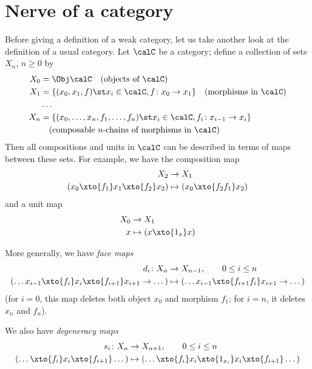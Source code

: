 \section{Nerve of a category}\label{s:nerve}
Before giving a definition of a weak category, let us take another look at the
definition of a usual category. Let $\calC$ be a category; define a collection
of sets $X_n$, $n\ge 0$ by
\begin{equation}\label{e:nerve1}
  \begin{aligned}
    X_0&= \Obj \calC \quad (\text{objects of $\calC$})\\
    X_1&= \{ (x_0, x_1, f)\st x_i \in \calC, f\colon x_0\to x_1\}
                \quad (\text{morphisms in $\calC$})\\
                &\dots\\
    X_n&=\{(x_0, \dots, x_n, f_1, \dots, f_n)\st
           x_i \in \calC, f_i\colon x_{i-1}\to x_i \}\\
            &\quad (\text{composable $n$-chains of morphisms in $\calC$})\\
  \end{aligned}
\end{equation}
Then all compositions and units in $\calC$ can be described in terms
of maps between these sets. For example, we have the composition map
\begin{align*}
  X_2&\to X_1\\
  (x_0\xto{f_1} x_1 \xto{f_2}x_2)&\mapsto (x_0\xto{f_2f_1} x_2)
\end{align*}
and a unit map
\begin{align*}
  X_0&\to X_1\\
  x&\mapsto (x\xto{1_x} x)
\end{align*}

More generally, we have \emph{face maps}
\begin{equation}\label{e:nerve2}
  \begin{aligned}
  d_i\colon X_n&\to X_{n-1}, \qquad 0\le i \le n\\
  (\dots x_{i-1}\xto{f_i} x_i \xto{f_{i+1}} x_{i+1}\to \dots)
  &\mapsto
  (\dots x_{i-1}\xto{f_{i+1}f_i} x_{i+1}\to \dots)
  \end{aligned}
\end{equation}
(for $i=0$, this map deletes both object $x_0$ and morphism $f_1$; for $i=n$,
it deletes $x_n$ and $f_n$).

We also have \emph{degeneracy maps}
\begin{equation}\label{e:nerve3}
  \begin{aligned}
  s_i\colon X_n&\to X_{n+1}, \qquad 0\le i \le n\\
  (\dots \xto{f_i} x_i \xto{f_{i+1}} \dots)
  &\mapsto
  (\dots \xto{f_i} x_i \xto{1_{x_i}} x_i \xto{f_{i+1}} \dots)
  \end{aligned}
\end{equation}

